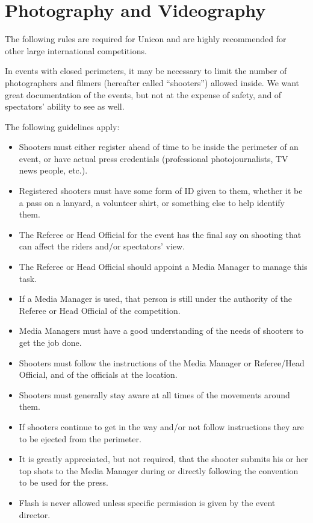\section{Photography and Videography}
The following rules are required for Unicon and are highly recommended for other large international competitions.

In events with closed perimeters, it may be necessary to limit the number of photographers and filmers (hereafter called ``shooters'') allowed inside.
We want great documentation of the events, but not at the expense of safety, and of spectators' ability to see as well.

The following guidelines apply:
\begin{itemize}
  \item Shooters must either register ahead of time to be inside the perimeter of an event, or have actual press credentials (professional photojournalists, TV news people, etc.).
  \item Registered shooters must have some form of ID given to them, whether it be a pass on a lanyard, a volunteer shirt, or something else to help identify them.
  \item The Referee or Head Official for the event has the final say on shooting that can affect the riders and/or spectators' view.
  \item The Referee or Head Official should appoint a Media Manager to manage this task.
  \item If a Media Manager is used, that person is still under the authority of the Referee or Head Official of the competition.
  \item Media Managers must have a good understanding of the needs of shooters to get the job done.
  \item Shooters must follow the instructions of the Media Manager or Referee/Head Official, and of the officials at the location.
  \item Shooters must generally stay aware at all times of the movements around them.
  \item If shooters continue to get in the way and/or not follow instructions they are to be ejected from the perimeter.
  \item It is greatly appreciated, but not required, that the shooter submits his or her top shots to the Media Manager during or directly following the convention to be used for the press.
  \item Flash is never allowed unless specific permission is given by the event director.
\end{itemize}

